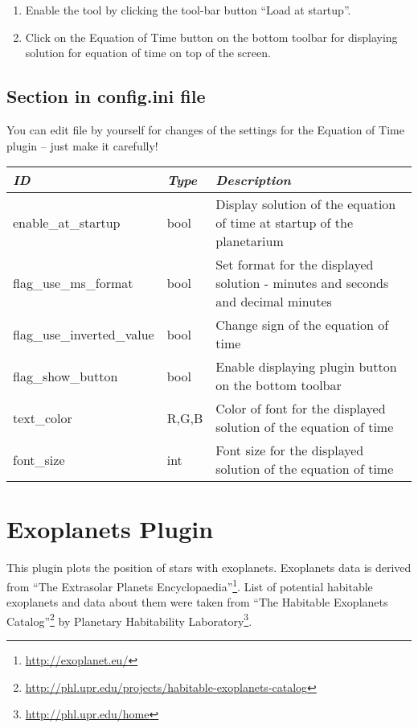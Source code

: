 \begin{enumerate}
\item Enable the tool by clicking the tool-bar button ``Load at startup''.
\item Click on the Equation of Time button on the bottom toolbar for displaying solution for equation of time on top of the screen.
\end{enumerate}

\subsection{Section  in config.ini file}
\label{sec:plugins:EquationOfTime:config}

You can edit  file by yourself for changes of the
settings for the Equation of Time plugin -- just make it carefully!

\begin{longtabu} to \textwidth {l|l|X}\toprule
\emph{ID}            & \emph{Type} & \emph{Description}\\\midrule
enable\_at\_startup  & bool & Display solution of the equation of time at startup of the planetarium\\\midrule
flag\_use\_ms\_format & bool & Set format for the displayed solution - minutes and seconds and decimal minutes\\\midrule
flag\_use\_inverted\_value & bool & Change sign of the equation of time \\\midrule
flag\_show\_button & bool & Enable displaying plugin button on the bottom toolbar\\\midrule
text\_color & R,G,B & Color of font for the displayed solution of the equation of time\\\midrule
font\_size & int & Font size for the displayed solution of the equation of time \\\bottomrule
\end{longtabu}

\newpage

\section{Exoplanets Plugin}
\label{sec:plugins:Exoplanets}
This plugin plots the position of stars with exoplanets. Exoplanets data is derived from ``The Extrasolar Planets Encyclopaedia''\footnote{\url{http://exoplanet.eu/}}. List of potential habitable exoplanets and data about them were taken from ``The Habitable Exoplanets Catalog''\footnote{\url{http://phl.upr.edu/projects/habitable-exoplanets-catalog}} by Planetary Habitability Laboratory\footnote{\url{http://phl.upr.edu/home}}.


